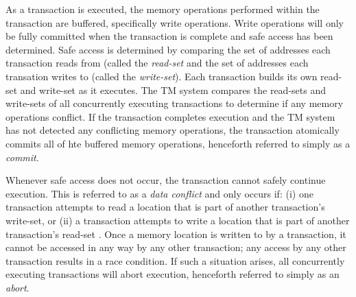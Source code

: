 \documentclass[11pt]{book}
\begin{document}



As a transaction is executed, the memory operations performed within the transaction are
buffered, specifically write operations.  Write operations will only be fully committed
when the transaction is complete and safe access has been determined.  Safe access is
determined by comparing the set of addresses each transaction reads from (called the
\emph{read-set} and the set of addresses each transation writes to (called the
\emph{write-set}).  Each transaction builds its own read-set and write-set as it executes.
The TM system compares the read-sets and write-sets of all concurrently executing
transactions to determine if any memory operations conflict.  If the transaction completes
execution and the TM system has not detected any conflicting memory operations, the
transaction atomically commits all of hte buffered memory operations, henceforth referred
to simply as a \emph{commit}.

Whenever safe access does not occur, the transaction cannot safely continue execution.
This is referred to as a \emph{data conflict} and only occurs if: (i) one transaction
attempts to read a location that is part of another transaction's write-set, or (ii) a
transaction attempts to write a location that is part of another transaction's read-set
\cite{intel_prog_ref}.  Once a memory location is written to by a transaction, it cannot
be accessed in any way by any other transaction; any access by any other transaction
results in a race condition.  If such a situation arises, all concurrently executing
transactions will abort execution, henceforth referred to simply as an \emph{abort}.
\end{document}
